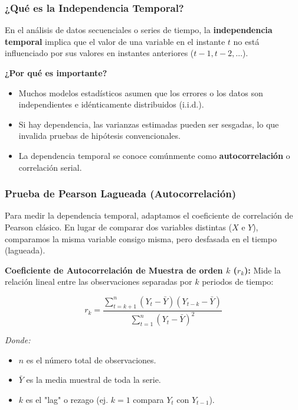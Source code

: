 \documentclass[aspectratio=1610, 10pt]{beamer}
\begin{document}


\begin{frame}
\frametitle{¿Qué es la Independencia Temporal?}
En el análisis de datos secuenciales o series de tiempo, la \textbf{independencia temporal} implica que el valor de una variable en el instante $t$ no está influenciado por sus valores en instantes anteriores ($t-1, t-2, \dots$).

\vspace{0.3cm}
\textbf{¿Por qué es importante?}
\begin{itemize}
    \item Muchos modelos estadísticos asumen que los errores o los datos son independientes e idénticamente distribuidos (i.i.d.).
    \item Si hay dependencia, las varianzas estimadas pueden ser sesgadas, lo que invalida pruebas de hipótesis convencionales.
    \item La dependencia temporal se conoce comúnmente como \textbf{autocorrelación} o correlación serial.
\end{itemize}
\end{frame}

\begin{frame}
\frametitle{Prueba de Pearson Lagueada (Autocorrelación)}
Para medir la dependencia temporal, adaptamos el coeficiente de correlación de Pearson clásico. En lugar de comparar dos variables distintas ($X$ e $Y$), comparamos la misma variable consigo misma, pero desfasada en el tiempo (lagueada).

\vspace{0.3cm}
\textbf{Coeficiente de Autocorrelación de Muestra de orden $k$ ($r_k$):}
Mide la relación lineal entre las observaciones separadas por $k$ periodos de tiempo:

$$r_k = \frac{\sum_{t=k+1}^n (Y_t - \bar{Y})(Y_{t-k} - \bar{Y})}{\sum_{t=1}^n (Y_t - \bar{Y})^2}$$

\vspace{0.2cm}
\textit{Donde:}
\begin{itemize}
    \item $n$ es el número total de observaciones.
    \item $\bar{Y}$ es la media muestral de toda la serie.
    \item $k$ es el "lag" o rezago (ej. $k=1$ compara $Y_t$ con $Y_{t-1}$).
\end{itemize}
\end{frame}
\end{document}
